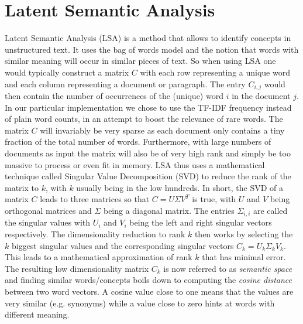 \section{Latent Semantic Analysis}

Latent Semantic Analysis (LSA) is a method that allows to identify concepts in unstructured text. It uses the bag of words model and the notion that words with similar meaning will occur in similar pieces of text. So when using LSA one would typically construct a matrix $C$  with each row representing a unique word and each column representing a document or paragraph. The entry $C_{i,j}$ would then contain the number of occurrences of the (unique) word $i$ in the document $j$. In our particular implementation we chose to use the TF-IDF frequency instead of plain word counts, in an attempt to boost the relevance of rare words. The matrix $C$ will invariably be very sparse as each document only contains a tiny fraction of the total number of words. Furthermore, with large numbers of documents as input the matrix will also be of very high rank and simply be too massive to process or even fit in memory. LSA thus uses a mathematical technique called Singular Value Decomposition (SVD) to reduce the rank of the matrix to $k$, with $k$ usually being in the low hundreds. In short, the SVD of a matrix $C$ leads to three matrices so that $C = U{\Sigma}V^T$ is true, with $U$ and $V$ being orthogonal matrices and $\Sigma$ being a diagonal matrix. The entries $\Sigma_{i,i}$ are called the singular values with $U_{i}$ and $V_{i}$ being the left and right singular vectors respectively. The dimensionality reduction to rank $k$ then works by selecting the $k$ biggest singular values and the corresponding singular vectors $C_{k} = U_{k}{\Sigma_{k}}V_{k}$. This leads to a mathematical approximation of rank $k$ that has minimal error.
The resulting low dimensionality matrix $C_{k}$ is now referred to as \emph{semantic space} and finding similar words/concepts boils down to computing the \emph{cosine distance} between two word vectors. A cosine value close to one means that the values are very similar (e.g. synonyms) while a value close to zero hints at words with different meaning.

